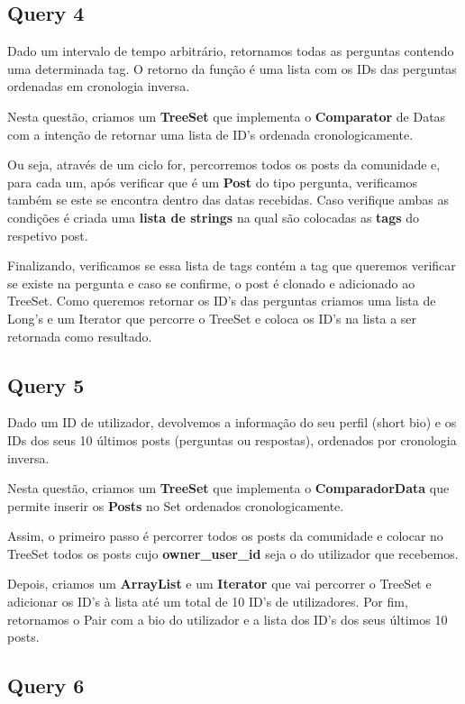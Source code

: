\documentclass[a4paper]{article}
\begin{document}
\subsection{Query 4}

Dado um intervalo de tempo arbitrário, retornamos todas as perguntas 
contendo uma determinada tag. O retorno da função é uma lista com os IDs 
das perguntas ordenadas em cronologia inversa.

Nesta questão, criamos um \textbf{TreeSet} que implementa o \textbf{Comparator} 
de Datas com a intenção de retornar uma lista de ID's ordenada cronologicamente.

Ou seja, através de um ciclo for, percorremos todos os posts da comunidade e, para
cada um, após verificar que é um \textbf{Post} do tipo pergunta, verificamos também
se este se encontra dentro das datas recebidas. Caso verifique ambas as condições é
criada uma \textbf{lista de strings} na qual são colocadas as \textbf{tags} do
respetivo post.

Finalizando, verificamos se essa lista de tags contém a tag que queremos verificar 
se existe na pergunta e caso se confirme, o post é clonado e adicionado ao TreeSet.
Como queremos retornar os ID's das perguntas criamos uma lista de Long's e um 
Iterator que percorre o TreeSet e coloca os ID's na lista a ser retornada como
resultado.

\subsection{Query 5}

Dado um ID de utilizador, devolvemos a informação do seu perfil (short 
bio) e os IDs dos seus 10 últimos posts (perguntas ou respostas), 
ordenados por cronologia inversa.

Nesta questão, criamos um \textbf{TreeSet} que implementa o \textbf{ComparadorData}
que permite inserir os \textbf{Posts} no Set ordenados cronologicamente.

Assim, o primeiro passo é percorrer todos os posts da comunidade e colocar no TreeSet
todos os posts cujo \textbf{owner\_user\_id} seja o do utilizador que recebemos.

Depois, criamos um \textbf{ArrayList} e um \textbf{Iterator} que vai percorrer o
TreeSet e adicionar os ID's à lista até um total de 10 ID's de utilizadores. 
Por fim, retornamos o Pair com a bio do utilizador e a lista dos ID's dos seus
últimos 10 posts.

\subsection{Query 6}
\end{document}
